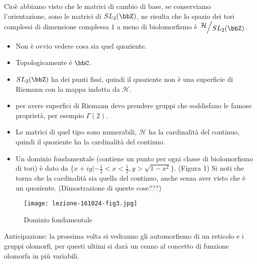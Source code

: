 Cioè abbiamo visto che le matrici di cambio di base, se conserviamo l'orientazione, sono le matrici di $SL_2(\bbZ)$, ne risulta che lo spazio dei tori complessi di dimensione complessa $1$ a meno di biolomorfismo è $\quotient{\mathcal{H}}{SL_2(\bbZ)}$.

\begin{osservazione}
\begin{itemize}
\item Non è ovvio vedere cosa sia quel quoziente.
\item Topologicamente è $\bbC$.
\item $SL_2(\bbZ)$ ha dei punti fissi, quindi il quoziente non è una superficie di Riemann con la mappa indotta da $\mathcal{H}$.
\item per avere superfici di Riemann devo prendere gruppi che soddisfano le famose proprietà, per esempio $\Gamma (2)$.
\item Le matrici di quel tipo sono numerabili, $\mathcal H$ ha la cardinalità del continuo, quindi il quoziente ha la cardinalità del continuo.
\item Un dominio fondamentale (contiene un punto per ogni classe di biolomorfismo di tori) è dato da $\{ x+iy | -\frac{1}{2}<x<\frac{1}{2}, y>\sqrt{1-x^2}\}$. (Figura 1)
Si noti che torna che la cardinalità sia quella del continuo, anche senza aver visto che è un quoziente. (Dimostrazione di queste cose???)
\end{itemize}
\end{osservazione}

\begin{figure}[h]
\texttt{[image: lezione-161024-fig3.jpg]}
\caption{Dominio fondamentale}\label{fig:2}
\end{figure}

Anticipazione: la prossima volta si vedranno gli automorfismo di un reticolo e i gruppi olomorfi, per questi ultimi si darà un cenno al concetto di funzione olomorfa in più variabili.
